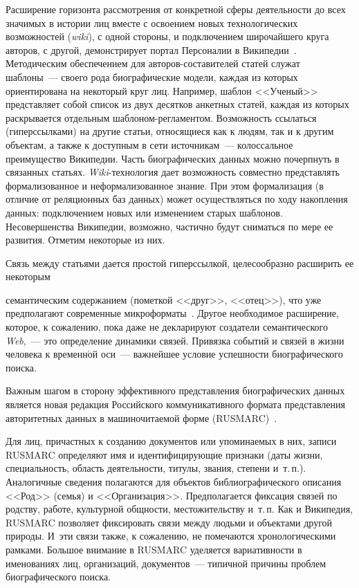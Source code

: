 \begin{multicols}{2}
  Расширение горизонта рассмотрения от конкретной сферы деятельности до 
всех значимых в истории лиц вместе с освоением новых технологических 
возможностей (\textit{wiki}), с одной стороны, и подключением широчайшего 
круга авторов, с другой, демонстрирует портал Персоналии в 
Википедии~\cite{6mar}. Методическим обеспечением для ав\-то\-ров-со\-ста\-ви\-те\-лей 
статей служат шаблоны~--- своего рода биографические модели, каждая из 
которых ориентирована на некоторый круг лиц. Например, шаблон 
<<Ученый>> представляет собой список из двух десятков анкетных статей, 
каждая из которых раскрывается отдельным шаблоном-регламентом. 
Возможность ссылаться (гиперссылками) на другие статьи, относящиеся как к 
людям, так и к другим объектам, а также к доступным в сети источникам~--- 
колоссальное преимущество Википедии. Часть биографических данных можно 
почерпнуть в связанных статьях. \textit{Wiki}-технология дает возможность 
совместно представлять формализованное и неформализованное знание. При 
этом формализация (в отличие от реляционных баз данных) может\linebreak 
осуществляться по ходу накопления данных: подключением новых или 
изменением старых шаб\-ло\-нов. Несовершенства Википедии, возможно, 
час\-тич\-но будут сниматься по мере ее развития.\linebreak
 Отметим некоторые из них. 

Связь между статьями дается простой гиперссылкой, целесообразно расширить 
ее некоторым\linebreak\vspace*{-12pt}

\pagebreak

\noindent
семантическим содержанием (пометкой <<друг>>,
 <<отец>>), 
что уже предполагают современные микроформаты~\cite{7mar}. Другое 
необходимое расширение, которое, к сожалению, пока даже не декларируют 
создатели семантического \textit{Web},~--- это определение динамики связей. 
Привязка событий и связей в жизни человека к временн$\acute{\mbox{о}}$й оси~--- важнейшее 
условие успешности биографического поиска.
  
  Важным шагом в сторону эффективного представления биографических 
данных является новая редакция Российского коммуникативного формата 
представления авторитетных данных в машиночитаемой форме 
(RUSMARC)~\cite{8mar}. 

Для лиц, причастных к созданию документов или 
упоми\-на\-емых в них, записи RUSMARC определяют имя и идентифицирующие 
признаки (даты жизни, специальность, область деятельности, титулы, звания, 
степени и~т.\,п.). Аналогичные сведения полагаются для объектов 
библиографического описания <<Род>> (семья) и <<Организация>>. 
Предполагается фиксация связей по родству, работе, культурной общности, 
местожительству и~т.\,п. Как и Википедия, RUSMARC позволяет 
фиксировать связи между людьми и объектами другой природы. И~эти связи 
также, к сожалению, не помечаются хронологическими рамками. Большое 
внимание в RUSMARC уделяется вариативности в именованиях лиц, 
организаций, документов~--- типичной причины проблем биографического 
поиска. 
  

\end{multicols}
